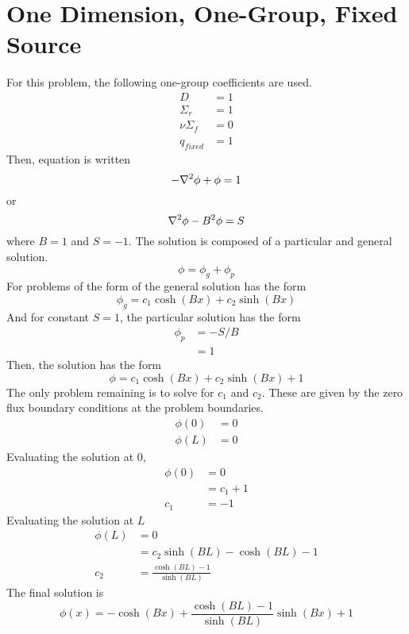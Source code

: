\section{One Dimension, One-Group, Fixed Source}
  For this problem, the following one-group coefficients are used.
  \begin{align*}
    D &= 1\\
    \Sigma_r &= 1\\
    \nu \Sigma_f &= 0\\
    q_{fixed} &= 1
  \end{align*}
  Then, equation  is written
  \begin{equation}
    - \mathbf{\nabla}^2 \phi + \phi = 1 
  \end{equation}
  or
  \begin{equation} \label{eq:diffusion_simplified}
    \mathbf{\nabla}^2 \phi - B^2 \phi = S
  \end{equation}
  where $B = 1$ and $S=-1$.
  The solution is composed of a particular and general solution.
  \begin{equation}
    \phi = \phi_g + \phi_p 
  \end{equation}
  For problems of the form of  the general 
  solution has the form
  \begin{equation} \label{eq:general}
    \phi_g = c_1 \cosh(Bx) + c_2 \sinh(Bx)
  \end{equation}
  And for constant $S=1$, the particular solution has the form
  \begin{align} \label{eq:particular}
    \phi_p &= -S/B \\
    \nonumber &= 1
  \end{align}
  Then, the solution has the form
  \begin{equation} 
    \phi = c_1 \cosh(Bx) + c_2 \sinh(Bx) + 1
  \end{equation}
  The only problem remaining is to solve for $c_1$ and $c_2$. These are given
  by the zero flux boundary conditions at the problem boundaries.
  \begin{align}
    \phi(0) &= 0\\
    \phi(L) &= 0
  \end{align}
  Evaluating the solution at 0, 
  \begin{align}
    \phi(0) &= 0 \\
    &= c_1 + 1\\
    c_1 &= -1
  \end{align}
  Evaluating the solution at $L$
  \begin{align}
    \phi(L) &= 0\\
    &= c_2 \sinh(BL) - \cosh(BL)-1\\
    c_2 &= \frac{\cosh(BL)-1}{\sinh(BL)}
  \end{align}
  The final solution is 
  \begin{equation} \label{eq:one_dimension}
    \phi(x) = -\cosh(Bx) + \frac{\cosh(BL)-1}{\sinh(BL)} \sinh(Bx) +1
  \end{equation}
  
